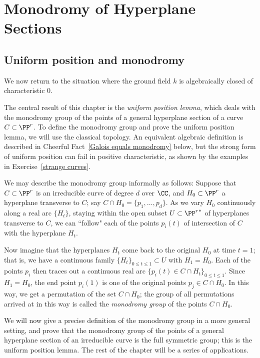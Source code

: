 



\chapter{Monodromy of Hyperplane Sections}\label{uniform position}

\section{Uniform position and monodromy} \label{uniformSection}
We now return to the situation where the ground field $k$ is algebraically closed of characteristic 0.

The central result of this chapter is the  \emph{uniform position lemma}, which deals with the monodromy group of the points of a general hyperplane section of a curve $C \subset \PP^r$. To define the monodromy group  and prove the  uniform position lemma, we will use the classical topology. An equivalent algebraic definition is described in Cheerful Fact~\ref{Galois equals monodromy} below, but the strong form of uniform position can fail in positive characteristic,
as shown by the examples in Exercise~\ref{strange curves}.


We may describe the monodromy group informally as follows: Suppose that $C \subset \PP^r$ is an irreducible curve of degree $d$ over $\CC$, and $H_0 \subset \PP^r$ a hyperplane transverse to $C$; say $C \cap H_0 = \{p_1,\dots,p_d\}$. As we vary $H_0$ continuously along a real arc $\{H_t\}$, staying within the open subset $U \subset {\PP^r}^*$ of hyperplanes transverse to $C$, we can ``follow" each of the points $p_i(t)$ of intersection of $C$ with the hyperplane $H_t$.

Now imagine that the hyperplanes $H_t$ come back to the original $H_0$ at time $t=1$; that is, we have a continuous family $\{H_t\}_{0 \leq t \leq 1} \subset U$ with $H_1 = H_0$. Each of the points $p_i$ then traces out a continuous real arc 
$\{p_i(t) \in C \cap H_t\}_{0 \leq t \leq 1}$. Since $H_1 = H_0$, the end point $p_i(1)$ is one of the original points $p_j \in C \cap H_0$. In this way, we get a permutation of the set $C \cap H_0$; the group of all permutations arrived at in this way is called the \emph{monodromy group} of the points $C \cap H_0$. 

We will now give a precise definition of the monodromy group in a more general setting, and prove that the monodromy group of the points of a general hyperplane section of an irreducible curve
 is the full symmetric group; this is the uniform position lemma. The rest of the chapter will be a series of applications.

